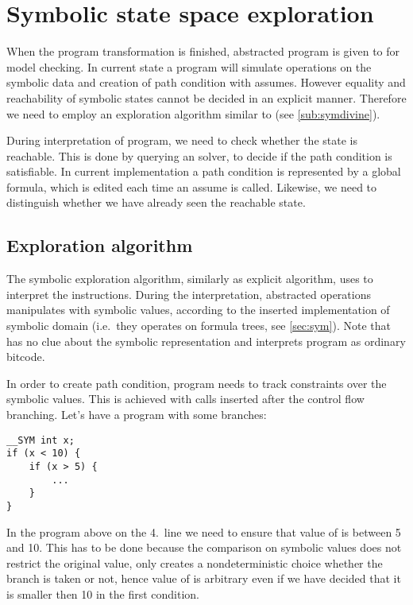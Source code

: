 \section{Symbolic state space exploration} \label{sec:symbolic}
When the program transformation is finished, abstracted program is given to
\DIVINE for model checking. In current state a program will simulate operations
on the symbolic data and creation of path condition with assumes. However
equality and reachability of symbolic states cannot be decided in an explicit
manner. Therefore we need to employ an exploration algorithm similar to
\SymDIVINE (see \autoref{sub:symdivine}).

During interpretation of program, we need to check whether the state is
reachable. This is done by querying an \SMT solver, to decide if the path
condition is satisfiable. In current implementation a path condition is
represented by a global formula, which is edited each time an assume is called.
Likewise, we need to distinguish whether we have already seen the reachable
state.

\subsection{Exploration algorithm}
The symbolic exploration algorithm, similarly as explicit algorithm, uses \DIVM
to interpret the \LLVM instructions. During the interpretation, abstracted
operations manipulates with symbolic values, according to the inserted implementation of
symbolic domain (i.e.~they operates on formula trees, see \autoref{sec:sym}).
Note that \DIVM has no clue about the symbolic representation and interprets
program as ordinary \LLVM bitcode.

In order to create path condition, program needs to track constraints over the
symbolic values. This is achieved with  calls inserted after the
control flow branching. Let's have a program with some branches:
\begin{verbatim}
__SYM int x;
if (x < 10) {
    if (x > 5) {
        ...
    }
}
\end{verbatim}
In the program above on the 4.~line we need to ensure that value of  is
between 5 and 10. This has to be done because the comparison on symbolic values
does not restrict the original value, only creates a nondeterministic choice
whether the branch is taken or not, hence value of  is arbitrary even if
we have decided that it is smaller then 10 in the first condition.


